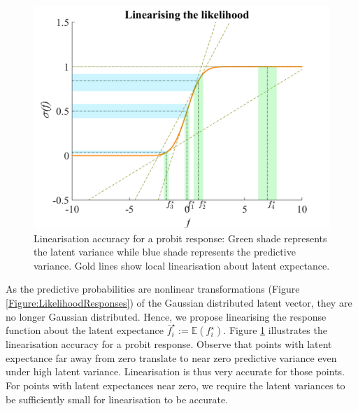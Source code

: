 \documentclass{article}
\begin{document}
		\begin{figure}[!htbp]
			\centering
				\includegraphics[width = \linewidth]{Figures/linearisation.png}
			\caption{Linearisation accuracy for a probit response: Green shade represents the latent variance while blue shade represents the predictive variance. Gold lines show local linearisation about latent expectance.}
			\label{Figure:Linearisation}
		\end{figure}
			
		As the predictive probabilities are nonlinear transformations (Figure \ref{Figure:LikelihoodResponses}) of the Gaussian distributed latent vector, they are no longer Gaussian distributed. Hence, we propose linearising the response function about the latent expectance $\bar{f}^{\star}_{i} := \mathbb{E}(f^{\star}_{i})$. Figure \ref{Figure:Linearisation} illustrates the linearisation accuracy for a probit response. Observe that points with latent expectance far away from zero translate to near zero predictive variance even under high latent variance. Linearisation is thus very accurate for those points. For points with latent expectances near zero, we require the latent variances to be sufficiently small for linearisation to be accurate.
\end{document}

